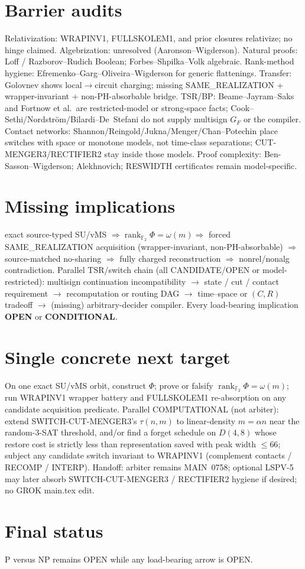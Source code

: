 \documentclass[11pt]{article}
\begin{document}
\section*{Barrier audits}
Relativization: WRAPINV1, FULLSKOLEM1, and prior closures relativize; no hinge claimed.
Algebrization: unresolved (Aaronson--Wigderson).
Natural proofs: Loff / Razborov--Rudich Boolean; Forbes--Shpilka--Volk algebraic.
Rank-method hygiene: Efremenko--Garg--Oliveira--Wigderson for generic flattenings.
Transfer: Golovnev shows local$\to$circuit charging; missing SAME\_REALIZATION + wrapper-invariant
+ non-PH-absorbable bridge.
TSR/BP: Beame--Jayram--Saks and Fortnow et al.\ are restricted-model or strong-space facts;
Cook--Sethi/Nordstr\"om/Bilardi--De~Stefani do not supply multisign $G_F$ or the compiler.
Contact networks: Shannon/Reingold/Jukna/Menger/Chan--Potechin place switches with space or
monotone models, not time-class separations; CUT-MENGER3/RECTIFIER2 stay inside those models.
Proof complexity: Ben-Sasson--Wigderson; Alekhnovich; RESWIDTH certificates remain model-specific.

\section*{Missing implications}
exact source-typed SU/vMS $\Rightarrow\operatorname{rank}_{\mathbb F_2}\Phi=\omega(m)
\Rightarrow$ forced SAME\_REALIZATION acquisition (wrapper-invariant, non-PH-absorbable)
$\Rightarrow$ source-matched no-sharing $\Rightarrow$ fully charged reconstruction
$\Rightarrow$ nonrel/nonalg contradiction.
Parallel TSR/switch chain (all CANDIDATE/OPEN or model-restricted):
multisign continuation incompatibility $\to$ state / cut / contact requirement
$\to$ recomputation or routing DAG $\to$ time--space or $(C,R)$ tradeoff
$\to$ (missing) arbitrary-decider compiler.
Every load-bearing implication \textbf{OPEN} or \textbf{CONDITIONAL}.

\section*{Single concrete next target}
On one exact SU/vMS orbit, construct $\Phi$; prove or falsify
$\boxed{\operatorname{rank}_{\mathbb F_2}\Phi=\omega(m)}$;
run WRAPINV1 wrapper battery and FULLSKOLEM1 re-absorption on any candidate acquisition predicate.
Parallel COMPUTATIONAL (not arbiter): extend SWITCH-CUT-MENGER3's $\tau(n,m)$ to linear-density
$m=\alpha n$ near the random-3-SAT threshold, and/or find a forget schedule on $D(4,8)$ whose
restore cost is strictly less than representation saved with peak width $\le 66$;
subject any candidate switch invariant to WRAPINV1 (complement contacts / RECOMP / INTERP).
Handoff: arbiter remains MAIN~0758; optional LSPV-5 may later absorb SWITCH-CUT-MENGER3 /
RECTIFIER2 hygiene if desired; no GROK main.tex edit.

\section*{Final status}
P versus NP remains OPEN while any load-bearing arrow is OPEN.

\end{document}

